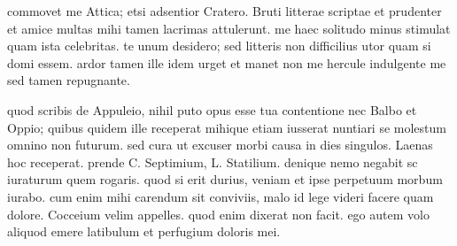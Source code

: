 


 commovet me Attica; etsi adsentior Cratero. Bruti litterae scriptae et prudenter et amice multas mihi tamen lacrimas attulerunt. me haec solitudo minus stimulat quam ista celebritas. te unum desidero; sed litteris non difficilius utor quam si domi essem. ardor tamen ille idem urget et manet non me hercule indulgente me sed tamen repugnante.

 quod scribis de Appuleio, nihil puto opus esse tua contentione nec Balbo et Oppio; quibus quidem ille receperat mihique etiam iusserat nuntiari se molestum omnino non futurum. sed cura ut excuser morbi causa in dies singulos. Laenas hoc receperat. prende C. Septimium, L. Statilium. denique nemo negabit sc iuraturum quem rogaris. quod si erit durius, veniam et ipse perpetuum morbum iurabo. cum enim mihi carendum sit conviviis, malo id lege videri facere quam dolore. Cocceium velim appelles. quod enim dixerat non facit. ego autem volo aliquod emere latibulum et perfugium doloris mei.
